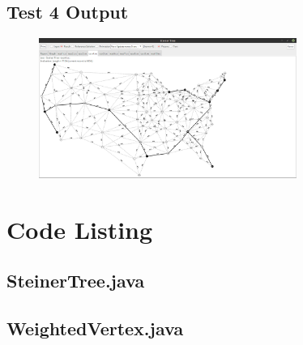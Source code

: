 \documentclass[12pt]{article}
\begin{document}
\subsection*{Test 4 Output}

\begin{figure}[h]
    \centering
    \includegraphics[width=0.75\textwidth]{test4.png}
\end{figure}

\section{Code Listing}
\subsection*{SteinerTree.java}
\lstset{basicstyle=\ttfamily\scriptsize, language=java}

\pagebreak
\subsection*{WeightedVertex.java}

\end{document}

